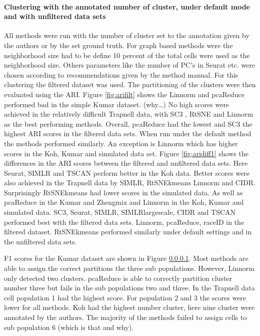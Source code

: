 \documentclass[11pt, a4paper]{article}\usepackage[]{graphicx}\usepackage[]{color}
\begin{document}
\paragraph{Clustering with the annotated number of cluster, under default mode and with unfiltered data sets}
All methods were run with the number of cluster set to the annotation given by the authors or by the set ground truth. For graph based methods were the neighborhood size had to be define 10 percent of the total cells were used as the  neighborhood size. Others parameters like the number of PC's in Seurat etc. were chosen according to recommendations given by the method manual. For this clustering the filtered dataset was used. 
The partitioning of the clusters were then evaluated using the ARI. Figure \ref{fig:arifilt} shows the Linnorm and pcaReduce performed bad in the simple Kumar dataset.   (why…) No high scores were achieved  in the relatively difficult Trapnell data, with SC3  , RtSNE and Linnorm as the best performing methods. Overall, pcaReduce had the lowest and  SC3  the highest ARI scores  in the filtered data sets. When run under the default method the methods performed similarly. An exception is Linnorm which has higher scores in the Koh, Kumar and simulated data set.
Figure \ref{fig:aridiff1} shows the differences in the ARI scores between the filtered and unfiltered data sets. Here Seurat,  SIMLR and TSCAN perform better in the Koh data. Better scores were also achieved in the Trapnell data by SIMLR, RtSNEkmeans Linnorm and CIDR. Surprisingly RtSNEkmeans had lower scores in the simulated data. As well as pcaReduce in the Kumar and Zhengmix and Linnorm in the Koh, Kumar and simulated data. 
SC3, Seurat, SIMLR, SIMLRlargescale, CIDR and TSCAN performed best with the filtered data sets. Linnorm, pcaReduce, raceID in the filtered dataset. RtSNEkmeans performed similarly under default settings and in the unfiltered data sets.


F1 scores for the Kumar dataset are shown in Figure \ref{}. Most methods are able to assign the correct partitions the three sub populations. However, Linnorm only detected two clusters. pcaReduce is able to correctly partition cluster number three but fails in the sub populations two and three. In the Trapnell data cell population 1 had the highest score. For population 2 and 3 the scores were lower for all methods.
Koh had the highest number cluster, here nine cluster were annotated by the authors. The majority of the methods failed to assign cells to sub population 6 (which is that and why).
\end{document}
